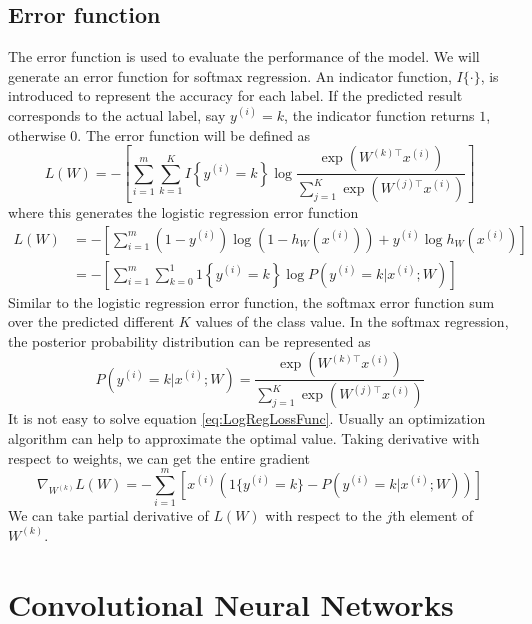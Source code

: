 \subsection{Error function}
The error function is used to evaluate the performance of the model. We will generate an error function for softmax regression. An indicator function, $I\{\cdot\}$, is introduced to represent the accuracy for each label. If the predicted result corresponds to the actual label, say $y^{(i)} = k$, the indicator function returns $1$, otherwise $0$. The error function will be defined as
\begin{equation}\label{eq:LogLossFunc}
L(W) = - \left[ \sum_{i=1}^{m} \sum_{k=1}^{K}  I\left\{y^{(i)} = k\right\} \log \frac{\exp(W^{(k)\top} x^{(i)})}{\sum_{j=1}^K \exp(W^{(j)\top} x^{(i)})}\right]
\end{equation}
where this generates the logistic regression error function
\begin{align}\label{eq:LogRegLossFunc}
L(W) &= - \left[ \sum_{i=1}^m   (1-y^{(i)}) \log (1-h_W(x^{(i)})) + y^{(i)} \log h_W(x^{(i)}) \right] \\
&= - \left[ \sum_{i=1}^{m} \sum_{k=0}^{1} 1\left\{y^{(i)} = k\right\} \log P(y^{(i)} = k | x^{(i)} ; W) \right]
\end{align}
Similar to the logistic regression error function, the softmax error function sum over the predicted different $K$ values of the class value. In the softmax regression, the posterior probability distribution can be represented as
\begin{equation}\label{eq:PostProbDis}
P(y^{(i)} = k | x^{(i)} ; W) = \frac{\exp(W^{(k)\top} x^{(i)})}{\sum_{j=1}^K \exp(W^{(j)\top} x^{(i)}) }
\end{equation}
It is not easy to solve equation \ref{eq:LogRegLossFunc}. Usually an optimization algorithm can help to approximate the optimal value. Taking derivative with respect to weights, we can get the entire gradient 
\begin{equation}\label{eq:PartDer}
\nabla_{W^{(k)}} L(W) = - \sum_{i=1}^{m}{ \left[ x^{(i)} \left( 1\{ y^{(i)} = k\}  - P(y^{(i)} = k | x^{(i)}; W) \right) \right]  }
\end{equation}
We can take partial derivative of $L(W)$ with respect to the $j$th element of $W^{(k)}$.

\section{Convolutional Neural Networks}

